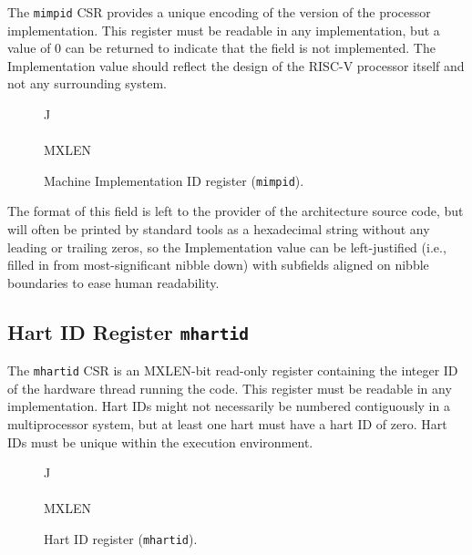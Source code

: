 The {\tt mimpid} CSR provides a unique encoding of the version of the
processor implementation.  This register must be readable in any
implementation, but a value of 0 can be returned to indicate that the
field is not implemented.  The Implementation value should reflect the
design of the RISC-V processor itself and not any surrounding system.

\begin{figure}[h!]
{\footnotesize
\begin{center}
\begin{tabular}{J}
 \\
\hline
{}  \\
\hline
MXLEN \\
\end{tabular}
\end{center}
}
\vspace{-0.1in}
\caption{Machine Implementation ID register ({\tt mimpid}).}
\label{mimpidreg}
\end{figure}

\begin{commentary}
The format of this field is left to the provider of the architecture
source code, but will often be printed by standard tools as a
hexadecimal string without any leading or trailing zeros, so the
Implementation value can be left-justified (i.e., filled in from
most-significant nibble down) with subfields aligned on nibble
boundaries to ease human readability.
\end{commentary}

\subsection{Hart ID Register {\tt mhartid}}

The {\tt mhartid} CSR is an MXLEN-bit read-only register
containing the integer ID of the hardware thread running the code.
This register must be readable in any implementation.  Hart IDs might
not necessarily be numbered contiguously in a multiprocessor system,
but at least one hart must have a hart ID of zero.  Hart IDs must be
unique within the execution environment.

\begin{figure}[h!]
{\footnotesize
\begin{center}
\begin{tabular}{J}
 \\
\hline
{}\\
\hline
MXLEN \\
\end{tabular}
\end{center}
}
\vspace{-0.1in}
\caption{Hart ID register ({\tt mhartid}).}
\label{mhartidreg}
\end{figure}


